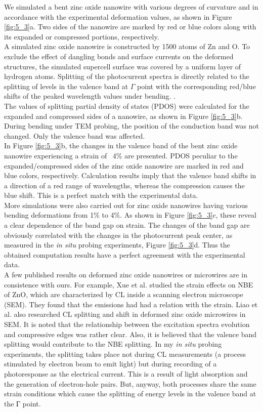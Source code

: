 We simulated a bent zinc oxide nanowire with various degrees of curvature and in accordance with the experimental deformation values, as shown in Figure \ref{fig:5_3}a.
Two sides of the nanowire are marked by red or blue colors along with its expanded or compressed portions, respectively. \\
A simulated zinc oxide nanowire is constructed by 1500 atoms of Zn and O. 
To exclude the effect of dangling bonds and surface currents on the deformed structures, the simulated supercell surface was covered by a uniform layer of hydrogen atoms. 
Splitting of the photocurrent spectra is directly related to the splitting of levels in the valence band at $\Gamma$ point with the corresponding red/blue shifts of the peaked wavelength values under bending. .\cite{Liao2012} \\
The values of splitting partial density of states (PDOS) were calculated for the expanded and compressed sides of a nanowire, as shown in Figure \ref{fig:5_3}b. 
During bending under TEM probing, the position of the conduction band was not changed. 
Only the valence band was affected. \\
In Figure \ref{fig:5_3}b, the changes in the valence band of the bent zinc oxide nanowire experiencing a strain of ~4\% are presented. 
PDOS peculiar to the expanded/compressed sides of the zinc oxide nanowire are marked in red and blue colors, respectively. 
Calculation results imply that the valence band shifts in a direction of a red range of wavelengths, whereas the compression causes the blue shift. 
This is a perfect match with the experimental data. \\
More simulations were also carried out for zinc oxide nanowires having various bending deformations from 1\% to 4\%. 
As shown in Figure \ref{fig:5_3}c, these reveal a clear dependence of the band gap on strain.  
The changes of the band gap are obviously correlated with the changes in the photocurrent peak center, as measured in the {\em in situ} probing experiments, Figure \ref{fig:5_3}d. 
Thus the obtained computation results have a perfect agreement with the experimental data. \\

A few published results on deformed zinc oxide nanowires or microwires are in consistence with ours. 
For example, Xue et al. studied the strain effects on NBE of ZnO, which are characterized by CL inside a scanning electron microscope (SEM). They found that the emissions had had a relation with the strain.\cite{G.2010}
Liao et al. also researched CL splitting and shift in deformed zinc oxide microwires in SEM. It is noted that the relationship between the excitation spectra evolution and compressive edges was rather clear. Also, it is believed that the valence band splitting would contribute to the NBE splitting.\cite{Moreira2009} 
In my {\em in situ} probing experiments, the splitting takes place not during CL measurements (a process stimulated by electron beam to emit light) but during recording of a photoresponse as the electrical current. 
This is a result of light absorption and the generation of electron-hole pairs.
But, anyway, both processes share the same strain conditions which cause the splitting of energy levels in the valence band at the Г point. 


